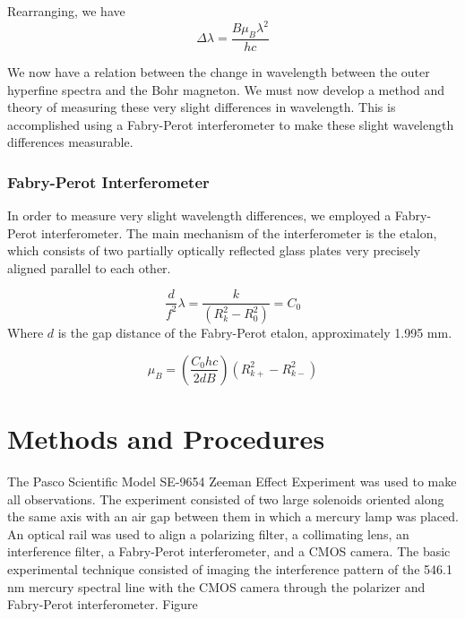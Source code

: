 \documentclass[twocolumn]{article}
\begin{document}
			Rearranging, we have
			\begin{equation}
				\Delta\lambda = \frac{B\mu_B\lambda^2}{hc}
			\end{equation}
			
			We now have a relation between the change in wavelength between the outer hyperfine spectra and the Bohr magneton.
			We must now develop a method and theory of measuring these very slight differences in wavelength.
			This is accomplished using a Fabry-Perot interferometer to make these slight wavelength differences measurable.
			
			\subsubsection{Fabry-Perot Interferometer}
				In order to measure very slight wavelength differences, we employed a Fabry-Perot interferometer.
				The main mechanism of the interferometer is the etalon, which consists of two partially optically reflected glass plates very precisely aligned parallel to each other.
				
				\begin{equation}
					\frac{d}{f^2}\lambda = \frac{k}{\left(R_k^2 - R_0^2 \right)} = C_0
					\label{eq:ConstantEq}
				\end{equation}
				Where $d$ is the gap distance of the Fabry-Perot etalon, approximately 1.995 mm.
			
			\begin{equation}
				\mu_B = \left( \frac{C_0 hc}{2dB} \right) \left( R_{k+}^2 - R_{k-}^2 \right)
				\label{eq:BohrEquation}
			\end{equation}
		

		
\section{Methods and Procedures}
	The Pasco Scientific Model SE-9654 Zeeman Effect Experiment was used to make all observations.
	The experiment consisted of two large solenoids oriented along the same axis with an air gap between them in which a mercury lamp was placed.
	An optical rail was used to align a polarizing filter, a collimating lens, an interference filter, a Fabry-Perot interferometer, and a CMOS camera.
	The basic experimental technique consisted of imaging the interference pattern of the 546.1 nm mercury spectral line with the CMOS camera through the polarizer and Fabry-Perot interferometer.
	Figure 
	
\end{document}
